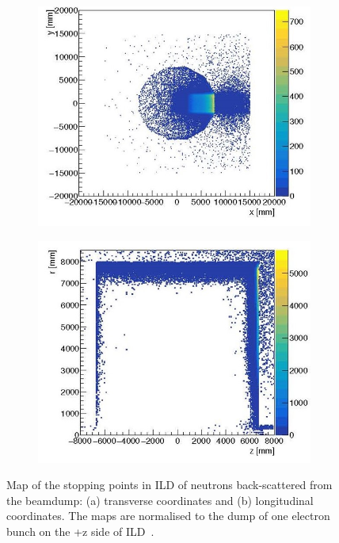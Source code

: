 \begin{figure}[t!]
\centering
\begin{subfigure}{0.48\textwidth}
\includegraphics[width=1.0\hsize]{Integration/fig/BG_neutrons_a.jpg}
\caption{}
\end{subfigure}
\begin{subfigure}{0.48\textwidth}
\includegraphics[width=1.0\hsize]{Integration/fig/BG_neutrons_b.jpg}
\caption{}
\end{subfigure}
\caption{\label{fig:integration:neutrons}Map of the stopping points in ILD of neutrons back-scattered from the beamdump: (a) transverse coordinates and (b) longitudinal coordinates. The maps are normalised to the dump of one electron bunch on the +z side of ILD~\cite{ild:bib:schuetz_thesis}.}
\end{figure}


